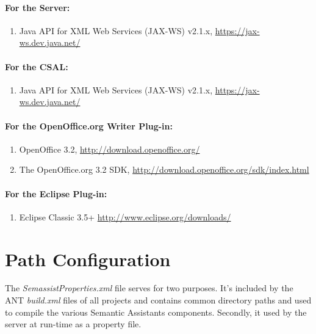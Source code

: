 \paragraph{For the \sa Server:}
\begin{enumerate}
  \item Java API for XML Web Services (JAX-WS) v2.1.x, \url{https://jax-ws.dev.java.net/}
\end{enumerate}

\paragraph{For the CSAL:}
\begin{enumerate}
  \item Java API for XML Web Services (JAX-WS) v2.1.x, \url{https://jax-ws.dev.java.net/}
\end{enumerate}

\paragraph{For the OpenOffice.org Writer Plug-in:}
\begin{enumerate}
\item OpenOffice 3.2, \url{http://download.openoffice.org/}
\item The OpenOffice.org 3.2 SDK,
  \url{http://download.openoffice.org/sdk/index.html}
\end{enumerate}

\paragraph{For the Eclipse Plug-in:}
\begin{enumerate}
\item Eclipse Classic 3.5+ \url{http://www.eclipse.org/downloads/}
\end{enumerate}


\section{Path Configuration}
\label{sec:props}
The \emph{SemassistProperties.xml} file serves for two purposes.  It's
included by the ANT \emph{build.xml} files of all projects and
contains common directory paths and used to compile the various
Semantic Assistants components. Secondly, it used by the server at
run-time as a property file.

